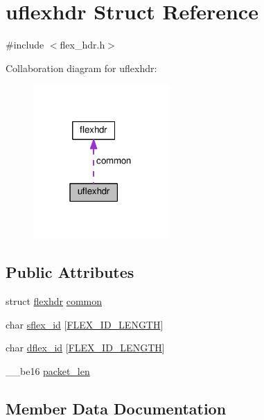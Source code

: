 \hypertarget{structuflexhdr}{}\section{uflexhdr Struct Reference}
\label{structuflexhdr}


{\ttfamily \#include $<$flex\+\_\+hdr.\+h$>$}



Collaboration diagram for uflexhdr\+:\nopagebreak
\begin{figure}[H]
\begin{center}
\leavevmode
\includegraphics[width=147pt]{structuflexhdr__coll__graph}
\end{center}
\end{figure}
\subsection*{Public Attributes}
\begin{DoxyCompactItemize}
\item 
struct \hyperlink{structflexhdr}{flexhdr} \hyperlink{structuflexhdr_a298ecaecd1223467c1820a652458cff9}{common}
\item 
char \hyperlink{structuflexhdr_a359db5a95d160b5bacdde8883a9d1ee7}{sflex\+\_\+id} \mbox{[}\hyperlink{flex__const_8h_a342f27a8d723d83c803e6d934f999ada}{F\+L\+E\+X\+\_\+\+I\+D\+\_\+\+L\+E\+N\+G\+TH}\mbox{]}
\item 
char \hyperlink{structuflexhdr_a8733c5298ef2cdefd132ecec4878605f}{dflex\+\_\+id} \mbox{[}\hyperlink{flex__const_8h_a342f27a8d723d83c803e6d934f999ada}{F\+L\+E\+X\+\_\+\+I\+D\+\_\+\+L\+E\+N\+G\+TH}\mbox{]}
\item 
\+\_\+\+\_\+be16 \hyperlink{structuflexhdr_a633f53e21cbca9248040e940553af36e}{packet\+\_\+len}
\end{DoxyCompactItemize}


\subsection{Member Data Documentation}
